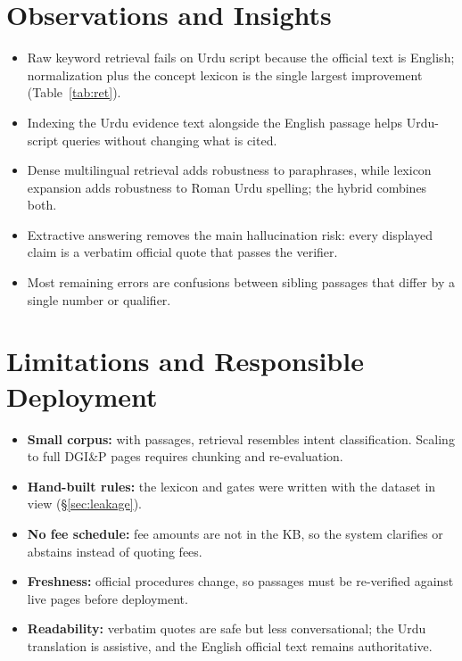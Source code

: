 \documentclass[12pt,a4paper]{article}
\begin{document}
\section{Observations and Insights}
\begin{itemize}
    \item Raw keyword retrieval fails on Urdu script because the official text is English; normalization plus the concept
          lexicon is the single largest improvement (Table~\ref{tab:ret}).
    \item Indexing the Urdu evidence text alongside the English passage helps Urdu-script queries without changing what is
          cited.
    \item Dense multilingual retrieval adds robustness to paraphrases, while lexicon expansion adds robustness to Roman Urdu
          spelling; the hybrid combines both.
    \item Extractive answering removes the main hallucination risk: every displayed claim is a verbatim official quote that
          passes the verifier.
    \item Most remaining errors are confusions between sibling passages that differ by a single number or qualifier.
\end{itemize}

\section{Limitations and Responsible Deployment}
\begin{itemize}
    \item \textbf{Small corpus:} with \RNPassages{} passages, retrieval resembles intent classification. Scaling to full
          DGI\&P pages requires chunking and re-evaluation.
    \item \textbf{Hand-built rules:} the lexicon and gates were written with the dataset in view (\S\ref{sec:leakage}).
    \item \textbf{No fee schedule:} fee amounts are not in the KB, so the system clarifies or abstains instead of quoting fees.
    \item \textbf{Freshness:} official procedures change, so passages must be re-verified against live pages before deployment.
    \item \textbf{Readability:} verbatim quotes are safe but less conversational; the Urdu translation is assistive, and the
          English official text remains authoritative.
\end{itemize}
\end{document}

